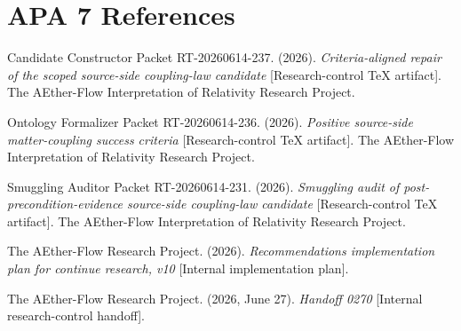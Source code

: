 \documentclass[11pt]{article}
\begin{document}
\section{APA 7 References}

Candidate Constructor Packet RT-20260614-237. (2026). \emph{Criteria-aligned
repair of the scoped source-side coupling-law candidate} [Research-control
TeX artifact]. The AEther-Flow Interpretation of Relativity Research Project.

Ontology Formalizer Packet RT-20260614-236. (2026). \emph{Positive
source-side matter-coupling success criteria} [Research-control TeX artifact].
The AEther-Flow Interpretation of Relativity Research Project.

Smuggling Auditor Packet RT-20260614-231. (2026). \emph{Smuggling audit of
post-precondition-evidence source-side coupling-law candidate}
[Research-control TeX artifact]. The AEther-Flow Interpretation of Relativity
Research Project.

The AEther-Flow Research Project. (2026). \emph{Recommendations implementation
plan for continue research, v10} [Internal implementation plan].

The AEther-Flow Research Project. (2026, June 27). \emph{Handoff 0270}
[Internal research-control handoff].
\end{document}
